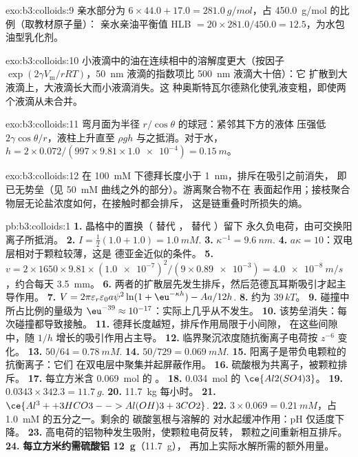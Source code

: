 \begin{solution}{exo:b3:colloids:9}
亲水部分为 $6 \times 44.0 + 17.0 = \qty{281.0}{g/mol}$，占 \qty{450.0}{g/mol} 的比例（取教材原子量）：
亲水亲油平衡值 HLB $= 20 \times 281.0/450.0 = 12.5$，为水包油型乳化剂。
\end{solution}

\begin{solution}{exo:b3:colloids:10}
小液滴中的油在连续相中的溶解度更大（按因子
$\exp(2\gamma V_{\mathrm m}/rRT)$，\qty{50}{nm} 液滴的指数项比 \qty{500}{nm} 液滴大十倍）：它
扩散到大液滴上，大液滴长大而小液滴消失。这
种奥斯特瓦尔德熟化使乳液变粗，即使两个液滴从未合并。
\end{solution}

\begin{solution}{exo:b3:colloids:11}
弯月面为半径 $r/\cos\theta$ 的球冠：紧邻其下方的液体
压强低 $2\gamma\cos\theta/r$，液柱上升直至 $\rho gh$ 与之抵消。对于水，
$h = 2 \times 0.072/(997 \times 9.81 \times \num{1.0e-4}) = \qty{0.15}{m}$。
\end{solution}

\begin{solution}{exo:b3:colloids:12}
在 \qty{100}{mM} 下德拜长度小于 \qty{1}{nm}，排斥在吸引之前消失，
即已无势垒（见 \qty{50}{mM} 曲线之外的部分）。游离聚合物不在
表面起作用；接枝聚合物层无论盐浓度如何，在接触时都会排斥，
这是链重叠时所损失的熵。
\end{solution}

\begin{solution}{pb:b3:colloids:1}
\textbf{1.} 晶格中的置换（ 替代 ， 替代 ）留下
永久负电荷，由可交换阳离子所抵消。
\textbf{2.} $I = \frac12(1.0 + 1.0) = \qty{1.0}{mM}$.
\textbf{3.} $\kappa^{-1} = \qty{9.6}{nm}$.
\textbf{4.} $a\kappa = 10$：双电层相对于颗粒较薄，这是
德亚金近似的条件。
\textbf{5.} $v = 2 \times 1650 \times 9.81 \times (\num{1.0e-7})^2/(9 \times \num{0.89e-3}) = \qty{4.0e-8}{m/s}$，约合每天 \qty{3.5}{mm}。
\textbf{6.} 两者的扩散层先发生排斥，然后范德瓦耳斯吸引才起主导作用。
\textbf{7.} $V = 2\pi\varepsilon_r\varepsilon_0a\psi^2\ln(1 + \eu^{-\kappa h}) - Aa/12h$.
\textbf{8.} 约为 $39\,kT$。
\textbf{9.} 碰撞中所占比例的量级为 $\eu^{-39} \approx 10^{-17}$：实际上几乎从不发生。
\textbf{10.} 该势垒消失：每次碰撞都导致接触。
\textbf{11.} 德拜长度越短，排斥作用局限于小间隙，
在这些间隙中，随 $1/h$ 增长的吸引作用占主导。
\textbf{12.} 临界聚沉浓度随抗衡离子电荷按 $z^{-6}$ 变化。
\textbf{13.} $50/64 = \qty{0.78}{mM}$.
\textbf{14.} $50/729 = \qty{0.069}{mM}$.
\textbf{15.} 阳离子是带负电颗粒的抗衡离子：它们
在双电层中聚集并起屏蔽作用。
\textbf{16.} 硫酸根为共离子，被颗粒排斥。
\textbf{17.} 每立方米含 \qty{0.069}{mol} 的 。
\textbf{18.} \qty{0.034}{mol} 的 $\ce{Al2(SO4)3}$。
\textbf{19.} $0.0343 \times 342.3 = \qty{11.7}{g}$.
\textbf{20.} \qty{11.7}{kg} 每小时。
\textbf{21.} $\ce{Al^3+ + 3 HCO3- -> Al(OH)3 + 3 CO2}$.
\textbf{22.} $3 \times 0.069 = \qty{0.21}{mM}$，占 \qty{1.0}{mM} 的五分之一。剩余的
碳酸氢根与溶解的  对水起缓冲作用：pH
仅适度下降。
\textbf{23.} 高电荷的铝物种发生吸附，使颗粒电荷反转，
颗粒之间重新相互排斥。
\textbf{24.} \textbf{每立方米约需硫酸铝 \qty{12}{g}}（\qty{11.7}{g}），
再加上实际水解所需的额外用量。
\end{solution}
